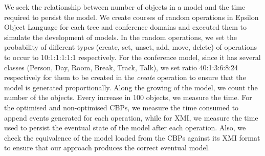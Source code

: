 \documentclass{llncs}
\begin{document}
We seek the relationship between number of objects in a model and the time required to persist the model. We create courses of random operations in Epsilon Object Language \cite{kolovos2006epsilon} for each tree and conference domains and executed them to simulate the development of models. In the random operations, we set the probability of different types (create, set, unset, add, move, delete) of operations to occur to 10:1:1:1:1:1 respectively. For the conference model, since it has several classes (Person, Day, Room, Break, Track, Talk), we set ratio 40:1:3:6:8:24 respectively for them to be created in the \emph{create} operation to ensure that the model is generated proportionally. Along the growing of the model, we count the number of the objects. Every increase in 100 objects, we measure the time. For  the optimised and non-optimised CBPs, we measure the time consumed to append events generated for each operation, while for XMI, we measure the time used to persist the eventual state of the model after each operation. Also, we check the equivalence of the model loaded from the CBPs against its XMI format to ensure that our approach produces the correct eventual model.
\end{document}
